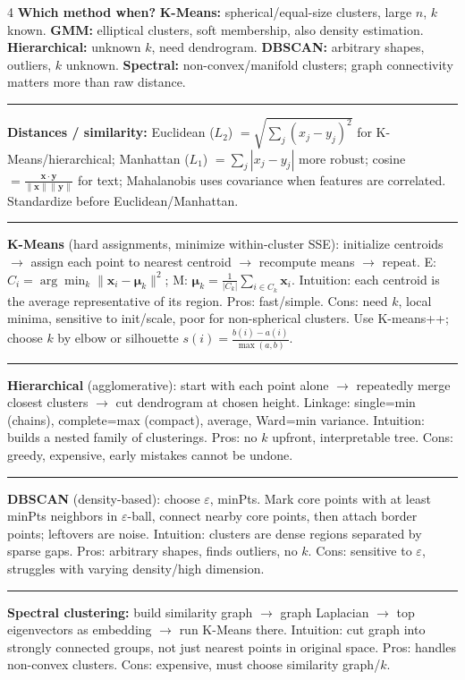 \documentclass[6.5pt,landscape]{article}
\makeatletter
\renewcommand{\section}{\@startsection{section}{1}{\z@}{0.3ex plus 0.05ex}{0.05ex}{\normalfont\scriptsize\bfseries\itshape}}
\newcommand{\rl}{\vspace{-1.5pt}\par\noindent\rule{\columnwidth}{0.15pt}\par\vspace{-1pt}}
\newcommand{\norm}[1]{\|#1\|}
\newcommand{\bx}{\mathbf{x}}
\newcommand{\by}{\mathbf{y}}
\newcommand{\bmu}{\boldsymbol{\mu}}
\makeatother
\begin{document}
\begin{multicols*}{4}
\section{Clustering (Unsupervised)}
\noindent\textbf{Which method when?} \textbf{K-Means:} spherical/equal-size clusters, large $n$, $k$ known. \textbf{GMM:} elliptical clusters, soft membership, also density estimation. \textbf{Hierarchical:} unknown $k$, need dendrogram. \textbf{DBSCAN:} arbitrary shapes, outliers, $k$ unknown. \textbf{Spectral:} non-convex/manifold clusters; graph connectivity matters more than raw distance.\par
\rl
\noindent\textbf{Distances / similarity:} Euclidean ($L_2$) $=\sqrt{\sum_j(x_j-y_j)^2}$ for K-Means/hierarchical; Manhattan ($L_1$) $=\sum_j|x_j-y_j|$ more robust; cosine $=\frac{\bx\cdot\by}{\norm{\bx}\norm{\by}}$ for text; Mahalanobis uses covariance when features are correlated. Standardize before Euclidean/Manhattan.\par
\rl
\noindent\textbf{K-Means} (hard assignments, minimize within-cluster SSE): initialize centroids $\to$ assign each point to nearest centroid $\to$ recompute means $\to$ repeat. E: $C_i=\arg\min_k\norm{\bx_i-\bmu_k}^2$; M: $\bmu_k=\frac{1}{|C_k|}\sum_{i\in C_k}\bx_i$. Intuition: each centroid is the average representative of its region. Pros: fast/simple. Cons: need $k$, local minima, sensitive to init/scale, poor for non-spherical clusters. Use K-means++; choose $k$ by elbow or silhouette $s(i)=\frac{b(i)-a(i)}{\max(a,b)}$.\par
\rl
\noindent\textbf{Hierarchical} (agglomerative): start with each point alone $\to$ repeatedly merge closest clusters $\to$ cut dendrogram at chosen height. Linkage: single=min (chains), complete=max (compact), average, Ward=min variance. Intuition: builds a nested family of clusterings. Pros: no $k$ upfront, interpretable tree. Cons: greedy, expensive, early mistakes cannot be undone.\par
\rl
\noindent\textbf{DBSCAN} (density-based): choose $\varepsilon$, minPts. Mark core points with at least minPts neighbors in $\varepsilon$-ball, connect nearby core points, then attach border points; leftovers are noise. Intuition: clusters are dense regions separated by sparse gaps. Pros: arbitrary shapes, finds outliers, no $k$. Cons: sensitive to $\varepsilon$, struggles with varying density/high dimension.\par
\rl
\noindent\textbf{Spectral clustering:} build similarity graph $\to$ graph Laplacian $\to$ top eigenvectors as embedding $\to$ run K-Means there. Intuition: cut graph into strongly connected groups, not just nearest points in original space. Pros: handles non-convex clusters. Cons: expensive, must choose similarity graph/$k$.\par

\end{multicols*}
\end{document}
